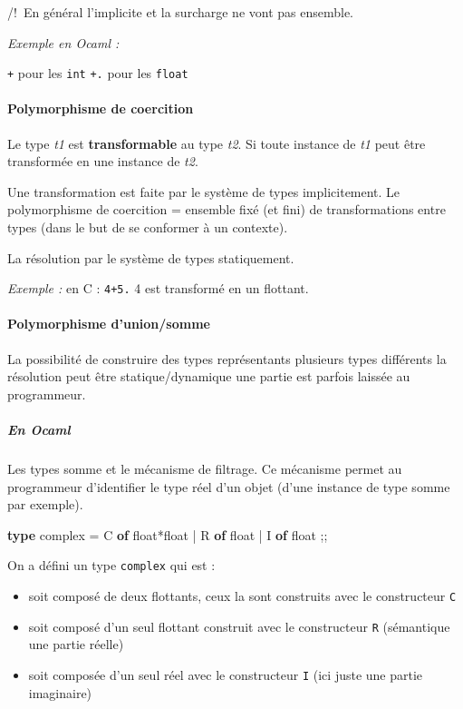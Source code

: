 \documentclass[]{article}
\newenvironment{Shaded}{}{}
\newcommand{\KeywordTok}[1]{\textcolor[rgb]{0.00,0.44,0.13}{\textbf{#1}}}
\newcommand{\DataTypeTok}[1]{\textcolor[rgb]{0.56,0.13,0.00}{#1}}
\newcommand{\NormalTok}[1]{#1}
\providecommand{\tightlist}{%
  \setlength{\itemsep}{0pt}\setlength{\parskip}{0pt}}
\let\oldparagraph\paragraph
\renewcommand{\paragraph}[1]{\oldparagraph{#1}\mbox{}}
\let\oldsubparagraph\subparagraph
\renewcommand{\subparagraph}[1]{\oldsubparagraph{#1}\mbox{}}
\begin{document}
/!~En général l'implicite et la surcharge ne vont pas ensemble.

\emph{Exemple en Ocaml :}

\texttt{+} pour les \texttt{int} \texttt{+.} pour les \texttt{float}

\paragraph{Polymorphisme de
coercition}\label{polymorphisme-de-coercition}

Le type \emph{t1} est \textbf{transformable} au type \emph{t2}. Si toute
instance de \emph{t1} peut être transformée en une instance de
\emph{t2}.

Une transformation est faite par le système de types implicitement. Le
polymorphisme de coercition = ensemble fixé (et fini) de transformations
entre types (dans le but de se conformer à un contexte).

La résolution par le système de types statiquement.

\emph{Exemple :} en C : \texttt{4+5.} 4 est transformé en un flottant.

\paragraph{Polymorphisme d'union/somme}\label{polymorphisme-dunionsomme}

La possibilité de construire des types représentants plusieurs types
différents la résolution peut être statique/dynamique une partie est
parfois laissée au programmeur.

\subparagraph{En Ocaml}\label{en-ocaml}

Les types somme et le mécanisme de filtrage. Ce mécanisme permet au
programmeur d'identifier le type réel d'un objet (d'une instance de type
somme par exemple).

\begin{Shaded}
\begin{Highlighting}[]
\KeywordTok{type}\NormalTok{ complex = C }\KeywordTok{of} \DataTypeTok{float}\NormalTok{*}\DataTypeTok{float}\NormalTok{ | R }\KeywordTok{of} \DataTypeTok{float}\NormalTok{ | I }\KeywordTok{of} \DataTypeTok{float}\NormalTok{ ;;}
\end{Highlighting}
\end{Shaded}

On a défini un type \texttt{complex} qui est :

\begin{itemize}
\tightlist
\item
  soit composé de deux flottants, ceux la sont construits avec le
  constructeur \texttt{C}
\item
  soit composé d'un seul flottant construit avec le constructeur
  \texttt{R} (sémantique une partie réelle)
\item
  soit composée d'un seul réel avec le constructeur \texttt{I} (ici
  juste une partie imaginaire)
\end{itemize}
\end{document}
